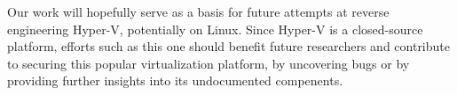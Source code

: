 \documentclass[runningheads]{llncs}
\begin{document}
Our work will hopefully serve as a basis for future attempts at reverse
engineering Hyper-V, potentially on Linux. Since Hyper-V is a closed-source
platform, efforts such as this one should benefit future researchers and
contribute to securing this popular virtualization platform, by uncovering bugs
or by providing further insights into its undocumented compenents.

%

\newpage


\end{document}
